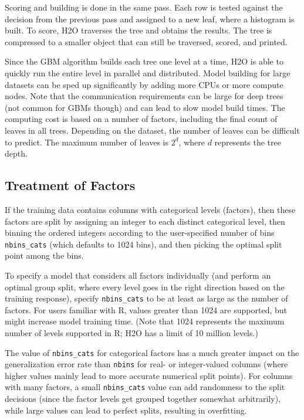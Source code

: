 Scoring and building is done in the same pass. Each row is tested against the decision from the previous pass and assigned
to a new leaf, where a histogram is built. To score, H2O traverses the tree and obtains the results. The
tree is compressed to a smaller object that can still be traversed, scored, and printed.

Since the GBM algorithm builds each tree one level at a time, H2O is able to quickly run the entire level in
parallel and distributed. Model building for large datasets can be sped up significantly by adding more CPUs or more compute nodes.
Note that the communication requirements can be large for deep trees (not common for GBMs though) and can lead to slow model build times. 
The computing cost is based on a number of factors, including the final count of leaves in all trees. Depending on the dataset, the number of leaves can be
difficult to predict. The maximum number of leaves is $2^d$, where $d$ represents the tree depth.

\subsection{Treatment of Factors}

If the training data contains columns with categorical levels (factors), then these factors are split by assigning an integer to each distinct
categorical level, then binning the ordered integers according to the user-specified number of bins \texttt{nbins\_cats} (which defaults to 1024 bins),
and then picking the optimal split point among the bins.

To specify a model that considers all factors individually (and perform an optimal group split,
where every level goes in the right direction based on the training response), specify \texttt{nbins\_cats} to be at least as large as the number of factors.
For users familiar with R, values greater than 1024 are supported, but might increase model training time. (Note that 1024 represents the maximum number of levels supported in R; H2O has a limit of 10 million levels.)

The value of \texttt{nbins\_cats} for categorical factors has a much greater impact on the generalization error rate than \texttt{nbins} for real- or integer-valued columns (where higher values mainly lead to more accurate numerical split points).
For columns with many factors, a small \texttt{nbins\_cats} value can add randomness to the split decisions (since the factor levels get grouped together somewhat arbitrarily), while large values can lead to perfect splits, resulting in overfitting.

